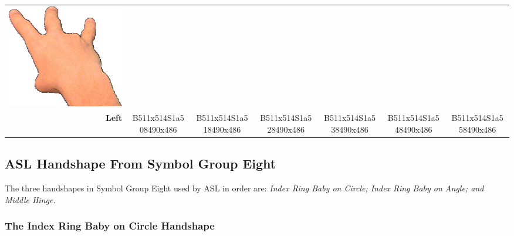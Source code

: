 \documentclass{article}
\begin{document}
\begin{center}
\begin{tabular}{r*{6}{c}}
\includegraphics[scale=0.1]{images/07-01-6.jpg}\\
\textbf{Left}&
B511x514S1a508490x486&
B511x514S1a518490x486&
B511x514S1a528490x486&
B511x514S1a538490x486&
B511x514S1a548490x486&
B511x514S1a558490x486\\
\end{tabular}
\end{center}

\subsection{ASL Handshape From Symbol Group Eight}

The three handshapes in Symbol Group Eight used by ASL in order are:
{\it
Index Ring Baby on Circle;
Index Ring Baby on Angle;
and Middle Hinge.
}

\subsubsection{The Index Ring Baby on Circle Handshape}
\end{document}
